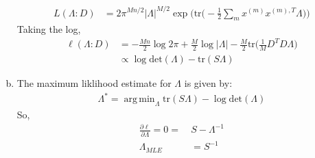 \documentclass{article}
\DeclareMathOperator*{\argmin}{arg\,min}
\begin{document}
\begin{enumerate}[(a)]
\begin{align*}
        L(\Lambda : D) &= 2\pi^{Mn/2}|\Lambda|^{M/2} \exp\bigg(\text{tr}\big(-\frac{1}{2}\sum_m x^{(m)}x^{(m),T}\Lambda\big)\bigg)
    \end{align*}
    Taking the log, 
    \begin{align*}
        \ell(\Lambda : D) &= -\frac{Mn}{2}\log 2\pi + \frac{M}{2}\log|\Lambda| - \frac{M}{2}\text{tr}\bigg(\frac{1}{M}D^TD\Lambda\bigg) \\
        &\propto \log \text{det}(\Lambda) - \text{tr}(S\Lambda)
    \end{align*}
    \item The maximum liklihood estimate for $\Lambda$ is given by: \begin{align*}
        \Lambda^{*} = \argmin_{\Lambda} \text{tr}(S\Lambda) - \log \text{det}(\Lambda)
    \end{align*} So, 
    \begin{align*}
        \frac{\partial \ell}{\partial \Lambda} = 0 = \ &S - \Lambda^{-1} \\[1.0ex]
        \Lambda_{MLE} &= S^{-1}
    \end{align*}
\end{enumerate}
\end{document}
